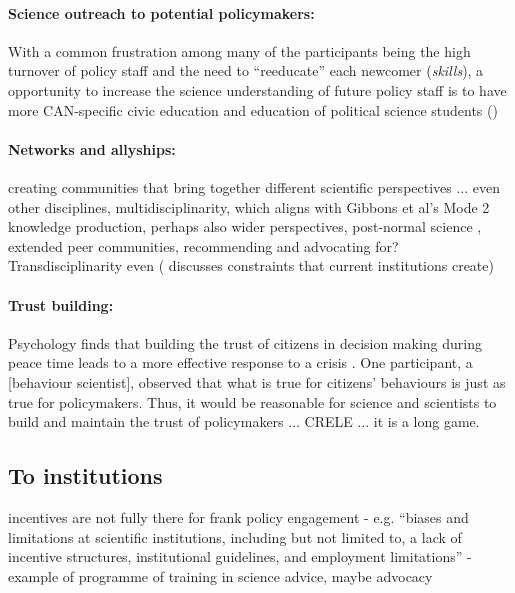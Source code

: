 \paragraph{Science outreach to potential policymakers:}
With a common frustration among many of the participants being the high turnover of policy staff and the need to ``reeducate'' each newcomer (\emph{skills}), a opportunity to increase the science understanding of future policy staff is to have more CAN-specific civic education and education of political science students (\cite{DykeM2024})

\paragraph{Networks and allyships:}

creating communities that bring together different scientific perspectives ... even other disciplines, multidisciplinarity, which aligns with Gibbons et al's Mode 2 knowledge production, perhaps also wider perspectives, post-normal science \cite{FuntowiczR1993}, extended peer communities, \cite{Jasanoff2003} recommending and advocating for? Transdisciplinarity even (\textcite{RussellWC2008} discusses constraints that current institutions create)

\paragraph{Trust building:}

Psychology finds that building the trust of citizens in decision making during peace time leads to a more effective response to a crisis \cite{BollykyP2024}. One participant, a [behaviour scientist], observed that what is true for citizens' behaviours is just as true for policymakers. Thus, it would be reasonable for science and scientists to build and maintain the trust of policymakers ... CRELE ... it is a long game.



\subsection{To institutions}
incentives are not fully there for frank policy engagement - e.g. \cite{ElsensohnACDGGKPRS2019} ``biases and limitations at scientific institutions, including but not limited to, a lack of incentive structures, institutional guidelines, and employment limitations'' - example of programme of training in science advice, maybe advocacy \cite{RussellWC2008}


